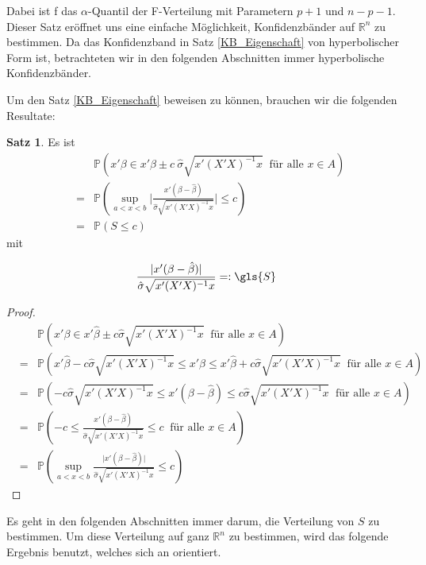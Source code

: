 \documentclass[12pt,a4paper]{article}
\theoremstyle{definition}
\theoremstyle{definition}
\newtheorem{Satz}[Definition]{Satz}
\theoremstyle{definition}
\begin{document}
Dabei ist \gls{f} das $\alpha$-Quantil der F-Verteilung mit Parametern $p+1$ und $n-p-1$. Dieser Satz eröffnet uns eine einfache Möglichkeit, Konfidenzbänder auf $\mathbb{R}^n$ zu bestimmen. Da das Konfidenzband in Satz \ref{KB_Eigenschaft} von hyperbolischer Form ist, betrachteten wir in den folgenden Abschnitten immer hyperbolische Konfidenzbänder.

Um den Satz \ref{KB_Eigenschaft} beweisen zu können, brauchen wir die folgenden Resultate:

\begin{Satz} \label{Basiseigenschaft}
Es ist
\begin{eqnarray*}
&&\mathbb{P}( x'\beta \in x' \hat{\beta} \pm c ~ \hat{\sigma} \sqrt{x' (X'X)^{-1} x} ~ \text{ für alle } x \in A ) \\
&=& \mathbb{P}( \sup_{a<x<b} \bigg \vert \frac{x'(\beta - \hat{\beta})}{\hat{\sigma} \sqrt{x'(X'X)^{-1}x}} \bigg \vert \leq c) \\
&=& \mathbb{P}( S \leq c)
\end{eqnarray*}
mit 

\begin{equation*}
\frac{\vert x'(\beta - \hat{\beta}) \vert}{\hat{\sigma} \sqrt{x'(X'X)^{-1}x}}  =:  \gls{S}
\end{equation*}

\end{Satz}

\begin{proof}
\begin{eqnarray*}
&& \mathbb{P}( x'\beta \in x' \hat{\beta} \pm c \hat{\sigma} \sqrt{x' (X'X)^{-1}x} ~ \text{ für alle } x \in A ) \\
&=& \mathbb{P}( x' \hat{\beta} - c \hat{\sigma} \sqrt{x' (X'X)^{-1}x} \leq x'\beta \leq x' \hat{\beta} + c \hat{\sigma} \sqrt{x' (X'X)^{-1}x} ~ \text{ für alle } x \in A ) \\
&=& \mathbb{P}( - c \hat{\sigma} \sqrt{x' (X'X)^{-1}x} \leq x' (\beta - \hat{\beta}) \leq  c \hat{\sigma} \sqrt{x' (X'X)^{-1}x} ~ \text{ für alle } x \in A ) \\
&=& \mathbb{P}( - c  \leq \frac{x' (\beta - \hat{\beta})}{\hat{\sigma} \sqrt{x' (X'X)^{-1}x}}  \leq  c ~ \text{ für alle } x \in A ) \\
&=& \mathbb{P}( \sup_{a<x<b}  \frac{\vert x'(\beta - \hat{\beta}) \vert}{\hat{\sigma} \sqrt{x'(X'X)^{-1}x}}  \leq c)
\end{eqnarray*}
\end{proof}

Es geht in den folgenden Abschnitten immer darum, die Verteilung von $S$ zu bestimmen. Um diese Verteilung auf ganz $\mathbb{R}^n$ zu bestimmen, wird das folgende Ergebnis benutzt, welches sich an \cite[6]{Liu64} orientiert. 
\end{document}
